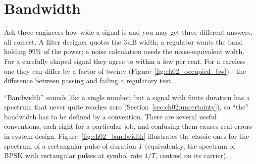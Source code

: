 \section{Bandwidth}
\label{sec:bandwidth}

Ask three engineers how wide a signal is and you may get three different answers, all correct. A
filter designer quotes the 3\,dB width; a regulator wants the band holding 99\% of the power; a
noise calculation needs the noise-equivalent width. For a carefully shaped signal they agree to
within a few per cent. For a careless one they can differ by a factor of twenty
(Figure~\ref{fig:ch02_occupied_bw})---the difference between passing and failing a regulatory test.


``Bandwidth'' sounds like a single number, but a signal with finite duration has a spectrum
that never quite reaches zero (Section~\ref{sec:ch02:uncertainty}), so ``the'' bandwidth has to be
defined by a convention. There are several useful conventions, each right for a particular job, and
confusing them causes real errors in system design. Figure~\ref{fig:ch02_bandwidth} illustrates the
classic ones for the spectrum of a rectangular pulse of duration $T$ (equivalently, the spectrum of
BPSK with rectangular pulses at symbol rate $1/T$, centred on its carrier).

